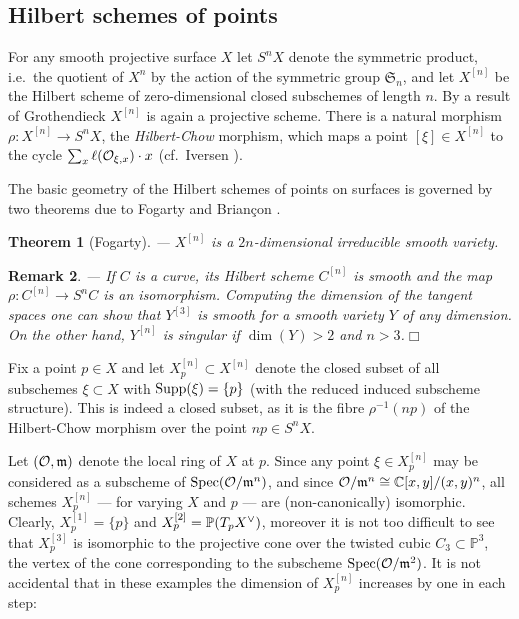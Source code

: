\documentclass[twoside,11pt]{article}
\newtheorem{theorem}{Theorem}[section]
\newtheorem{remark}[theorem]{Remark}
\newcommand{\qed}{\hspace*{\fill}$\Box$\vspace{2ex}}
\newcommand{\ko}{{\cal O}}
\newcommand{\IC}{{\mathbb C}}
\newcommand{\IP}{{\mathbb P}}
\newcommand{\gothm}{{\mathfrak m}}
\newcommand{\gothS}{{\mathfrak S}}
\newcommand{\dual}{\makebox[0mm]{}^{{\scriptstyle\vee}}}
\newcommand{\isom}{\cong}
\newcommand{\Supp}{{\rm Supp}}
\newcommand{\Spec}{{\rm Spec}}
\begin{document}
\subsection{Hilbert schemes of points}

For any smooth projective surface $X$ let $S^nX$ denote the symmetric product,
i.e.\ the quotient of $X^n$ by the action of the symmetric group $\gothS_n$,
and let $X^{[n]}$ be the Hilbert scheme of zero-dimensional closed subschemes of
length $n$. By a result of Grothendieck \cite{Bourbaki221} $X^{[n]}$ is again
a projective scheme. There is a natural morphism $\rho:X^{[n]}\to S^nX$, the
{\sl Hilbert-Chow} morphism, which maps a point $[\xi]\in X^{[n]}$ to the 
cycle $\sum_x\ell(\ko_{\xi,x})\cdot x$ (cf.\ Iversen \cite{Iversen}). 

The basic geo\-metry of the Hilbert schemes of points on surfaces is 
governed by two theorems due to Fogarty \cite{Fogarty} and Brian\c{c}on 
\cite{Briancon}.  

\begin{theorem}[Fogarty]--- $X^{[n]}$ is a $2n$-dimensional irreducible smooth variety.
\end{theorem}

\begin{remark}--- If $C$ is a curve, its Hilbert scheme $C^{[n]}$ is smooth
and the map $\rho:C^{[n]}\to S^nC$ is an isomorphism. Computing the dimension of the
tangent spaces one can show that $Y^{[3]}$ is smooth for a smooth variety $Y$ of any dimension. On the other hand, $Y^{[n]}$ is singular if $\dim(Y)>2$ and 
$n>3$.\qed
\end{remark}

Fix a point $p\in X$ and let $X^{[n]}_p\subset X^{[n]}$ 
denote the closed subset of all subschemes $\xi\subset X$ with $\Supp(\xi)=\{p\}$ (with the reduced induced subscheme structure). This is
indeed a closed subset, as it is the fibre $\rho^{-1}(np)$ of the
Hilbert-Chow morphism over the point $np\in S^nX$.

Let $(\ko,\gothm)$ denote
the local ring of $X$ at $p$. Since any point $\xi\in X^{[n]}_p$ may be 
considered as a subscheme of $\Spec(\ko/\gothm^n)$, and since
$\ko/\gothm^n\isom\IC[x,y]/(x,y)^n$, all schemes $X^{[n]}_p$ --- for varying $X$
and $p$ --- are (non-canonically) isomorphic. Clearly, $X^{[1]}_p=\{p\}$ and 
$X^{[2]}_p=\IP(T_{p}X\dual)$, moreover it is not too difficult to see that
$X^{[3]}_p$ is isomorphic to the projective cone over the twisted cubic
$C_3\subset \IP^3$, the vertex of the cone corresponding to the subscheme
$\Spec(\ko/\gothm^2)$. It is not accidental that in these examples the
dimension of $X^{[n]}_p$ increases by one in each step:
\end{document}
